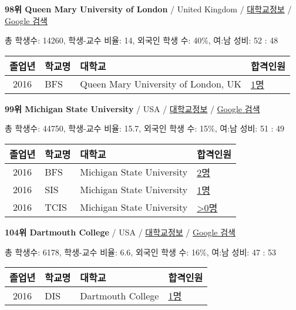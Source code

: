 \documentclass[13pt,]{article}
\begin{document}
\textbf{98위 Queen Mary University of London} / United Kingdom /
\href{https://www.timeshighereducation.com/world-university-rankings/queen-mary-university-of-london?ranking-dataset=133819}{대학교정보}
/
\href{http://www.google.com/search?q=Queen+Mary+University+of+London}{Google
검색}

총 학생수: 14260, 학생-교수 비율: 14, 외국인 학생 수: 40\%, 여:남 성비:
52 : 48

\begin{longtable}[]{@{}clll@{}}
\toprule
졸업년 & 학교명 & 대학교 & 합격인원\tabularnewline
\midrule
\endhead
2016 & BFS & Queen Mary University of London, UK &
\href{http://cafe.naver.com/assarabia/11597}{1명}\tabularnewline
\bottomrule
\end{longtable}

\textbf{99위 Michigan State University} / USA /
\href{https://www.timeshighereducation.com/world-university-rankings/michigan-state-university?ranking-dataset=133819}{대학교정보}
/ \href{http://www.google.com/search?q=Michigan+State+University}{Google
검색}

총 학생수: 44750, 학생-교수 비율: 15.7, 외국인 학생 수: 15\%, 여:남
성비: 51 : 49

\begin{longtable}[]{@{}clll@{}}
\toprule
졸업년 & 학교명 & 대학교 & 합격인원\tabularnewline
\midrule
\endhead
2016 & BFS & Michigan State University &
\href{http://cafe.naver.com/assarabia/11597}{2명}\tabularnewline
2016 & SIS & Michigan State University &
\href{http://cafe.naver.com/assarabia/11589}{1명}\tabularnewline
2016 & TCIS & Michigan State University &
\href{http://cafe.naver.com/assarabia/11598}{\textgreater{}0명}\tabularnewline
\bottomrule
\end{longtable}

\textbf{104위 Dartmouth College} / USA /
\href{https://www.timeshighereducation.com/world-university-rankings/dartmouth-college?ranking-dataset=133819}{대학교정보}
/ \href{http://www.google.com/search?q=Dartmouth+College}{Google 검색}

총 학생수: 6178, 학생-교수 비율: 6.6, 외국인 학생 수: 16\%, 여:남 성비:
47 : 53

\begin{longtable}[]{@{}clll@{}}
\toprule
졸업년 & 학교명 & 대학교 & 합격인원\tabularnewline
\midrule
\endhead
2016 & DIS & Dartmouth College &
\href{http://cafe.naver.com/assarabia/11591}{1명}\tabularnewline
\bottomrule
\end{longtable}
\end{document}
